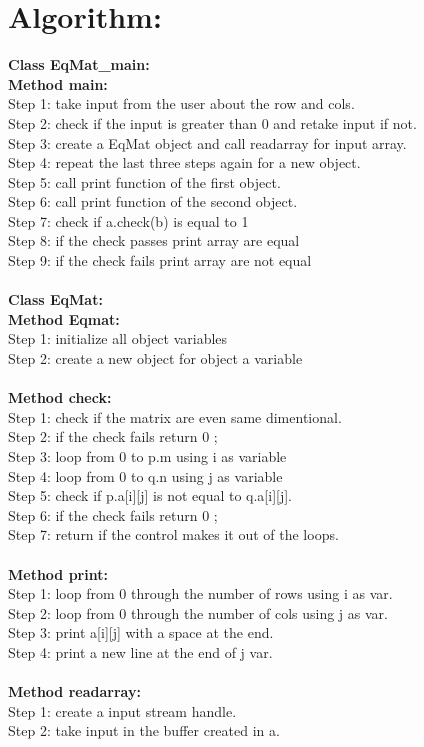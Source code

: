 \section*{Algorithm:}
\textbf{\color{javapurple}Class EqMat\_main:}\\
\textbf{Method main:}\\
Step 1: take input from the user about the row and cols.\\
Step 2: check if the input is greater than 0 and retake input if not.\\
Step 3: create a EqMat object and call readarray for input array.\\
Step 4: repeat the last three steps again for a new object.\\
Step 5: call print function of the first object.\\
Step 6: call print function of the second object.\\
Step 7: check if a.check(b) is equal to 1\\
Step 8: if the check passes print array are equal\\
Step 9: if the check fails print array are not equal\\\\
\textbf{\color{javapurple}Class EqMat:}\\
\textbf{Method Eqmat:}\\
Step 1: initialize all object variables\\
Step 2: create a new object for object a variable\\\\
\textbf{Method check:}\\
Step 1: check if the matrix are even same dimentional.\\
Step 2: if the check fails return 0 ; \\
Step 3: loop from 0 to p.m using i as variable\\
Step 4: loop from 0 to q.n using j as variable \\
Step 5: check if p.a[i][j] is not equal to q.a[i][j]. \\
Step 6: if the check fails return 0 ;\\
Step 7: return if the control makes it out of the loops.\\\\
\textbf{Method print:}\\
Step 1: loop from 0 through the number of rows using i as var.\\
Step 2: loop from 0 through the number of cols using j as var.\\
Step 3: print a[i][j] with a space at the end.\\
Step 4: print a new line at the end of j var.\\\\
\textbf{Method readarray:}\\
Step 1: create a input stream handle.\\
Step 2: take input in the buffer created in a.\\\\

